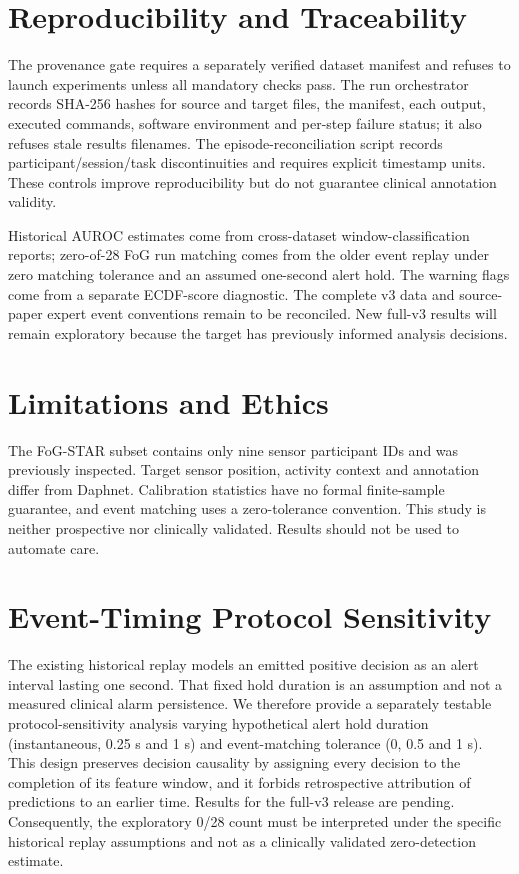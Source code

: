 \documentclass[sigconf,review,anonymous]{acmart}
\begin{document}
\section{Reproducibility and Traceability}
The provenance gate requires a separately verified dataset manifest and refuses to launch experiments unless all mandatory checks pass. The run orchestrator records SHA-256 hashes for source and target files, the manifest, each output, executed commands, software environment and per-step failure status; it also refuses stale results filenames. The episode-reconciliation script records participant/session/task discontinuities and requires explicit timestamp units. These controls improve reproducibility but do not guarantee clinical annotation validity.

Historical AUROC estimates come from cross-dataset window-classification reports; zero-of-28 FoG run matching comes from the older event replay under zero matching tolerance and an assumed one-second alert hold. The warning flags come from a separate ECDF-score diagnostic. The complete v3 data and source-paper expert event conventions remain to be reconciled. New full-v3 results will remain exploratory because the target has previously informed analysis decisions.

\section{Limitations and Ethics}
The FoG-STAR subset contains only nine sensor participant IDs and was previously inspected. Target sensor position, activity context and annotation differ from Daphnet. Calibration statistics have no formal finite-sample guarantee, and event matching uses a zero-tolerance convention. This study is neither prospective nor clinically validated. Results should not be used to automate care.
\section{Event-Timing Protocol Sensitivity}
The existing historical replay models an emitted positive decision as an alert interval lasting one second. That fixed hold duration is an assumption and not a measured clinical alarm persistence. We therefore provide a separately testable protocol-sensitivity analysis varying hypothetical alert hold duration (instantaneous, 0.25 s and 1 s) and event-matching tolerance (0, 0.5 and 1 s). This design preserves decision causality by assigning every decision to the completion of its feature window, and it forbids retrospective attribution of predictions to an earlier time. Results for the full-v3 release are pending. Consequently, the exploratory 0/28 count must be interpreted under the specific historical replay assumptions and not as a clinically validated zero-detection estimate.
\end{document}
